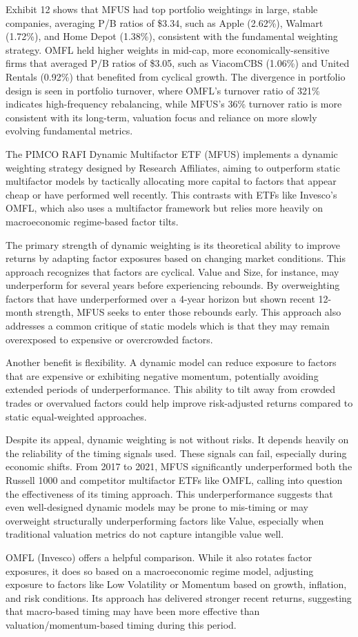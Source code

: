 \documentclass[
  letterpaper,
  DIV=11,
  numbers=noendperiod]{scrartcl}
\begin{document}
Exhibit 12 shows that MFUS had top portfolio weightings in large, stable
companies, averaging P/B ratios of \$3.34, such as Apple (2.62\%),
Walmart (1.72\%), and Home Depot (1.38\%), consistent with the
fundamental weighting strategy. OMFL held higher weights in mid-cap,
more economically-sensitive firms that averaged P/B ratios of \$3.05,
such as ViacomCBS (1.06\%) and United Rentals (0.92\%) that benefited
from cyclical growth. The divergence in portfolio design is seen in
portfolio turnover, where OMFL's turnover ratio of 321\% indicates
high-frequency rebalancing, while MFUS's 36\% turnover ratio is more
consistent with its long-term, valuation focus and reliance on more
slowly evolving fundamental metrics.

The PIMCO RAFI Dynamic Multifactor ETF (MFUS) implements a dynamic
weighting strategy designed by Research Affiliates, aiming to outperform
static multifactor models by tactically allocating more capital to
factors that appear cheap or have performed well recently. This
contrasts with ETFs like Invesco's OMFL, which also uses a multifactor
framework but relies more heavily on macroeconomic regime-based factor
tilts.

The primary strength of dynamic weighting is its theoretical ability to
improve returns by adapting factor exposures based on changing market
conditions. This approach recognizes that factors are cyclical. Value
and Size, for instance, may underperform for several years before
experiencing rebounds. By overweighting factors that have underperformed
over a 4-year horizon but shown recent 12-month strength, MFUS seeks to
enter those rebounds early. This approach also addresses a common
critique of static models which is that they may remain overexposed to
expensive or overcrowded factors.

Another benefit is flexibility. A dynamic model can reduce exposure to
factors that are expensive or exhibiting negative momentum, potentially
avoiding extended periods of underperformance. This ability to tilt away
from crowded trades or overvalued factors could help improve
risk-adjusted returns compared to static equal-weighted approaches.

Despite its appeal, dynamic weighting is not without risks. It depends
heavily on the reliability of the timing signals used. These signals can
fail, especially during economic shifts. From 2017 to 2021, MFUS
significantly underperformed both the Russell 1000 and competitor
multifactor ETFs like OMFL, calling into question the effectiveness of
its timing approach. This underperformance suggests that even
well-designed dynamic models may be prone to mis-timing or may
overweight structurally underperforming factors like Value, especially
when traditional valuation metrics do not capture intangible value well.

OMFL (Invesco) offers a helpful comparison. While it also rotates factor
exposures, it does so based on a macroeconomic regime model, adjusting
exposure to factors like Low Volatility or Momentum based on growth,
inflation, and risk conditions. Its approach has delivered stronger
recent returns, suggesting that macro-based timing may have been more
effective than valuation/momentum-based timing during this period.
\end{document}
